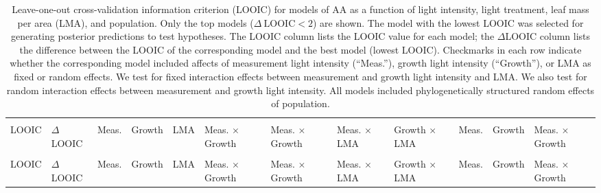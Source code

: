 \documentclass[
  letterpaper,
  DIV=11,
  numbers=noendperiod]{scrartcl}
\newcommand{\aax}{$\mathrm{AA}$}
\begin{document}
\begin{landscape}

\begin{longtable}[t]{>{\centering\arraybackslash}p{0.7in}>{\centering\arraybackslash}p{0.5in}>{\centering\arraybackslash}p{0.4in}>{\centering\arraybackslash}p{0.4in}>{\centering\arraybackslash}p{0.4in}>{\centering\arraybackslash}p{0.4in}>{\centering\arraybackslash}p{0.4in}>{\centering\arraybackslash}p{0.4in}>{\centering\arraybackslash}p{0.4in}>{\centering\arraybackslash}p{0.4in}>{\centering\arraybackslash}p{0.4in}>{\centering\arraybackslash}p{0.4in}}

\caption{\label{tbl-aa_loo2}Leave-one-out cross-validation information
criterion (LOOIC) for models of \aax{} as a function of light intensity,
light treatment, leaf mass per area (LMA), and population. Only the top
models (\(\Delta~\text{LOOIC} < 2\)) are shown. The model with the
lowest LOOIC was selected for generating posterior predictions to test
hypotheses. The LOOIC column lists the LOOIC value for each model; the
\(\Delta\)LOOIC column lists the difference between the LOOIC of the
corresponding model and the best model (lowest LOOIC). Checkmarks in
each row indicate whether the corresponding model included affects of
measurement light intensity (``Meas.''), growth light intensity
(``Growth''), or LMA as fixed or random effects. We test for fixed
interaction effects between measurement and growth light intensity and
LMA. We also test for random interaction effects between measurement and
growth light intensity. All models included phylogenetically structured
random effects of population.}

\tabularnewline

\toprule
\multicolumn{2}{c}{ } & \multicolumn{7}{c}{Fixed} & \multicolumn{3}{c}{Random} \\
\cmidrule(l{3pt}r{3pt}){3-9} \cmidrule(l{3pt}r{3pt}){10-12}
LOOIC & $\Delta$LOOIC & Meas. & Growth & LMA & Meas. $\times$ Growth & Meas. $\times$ Growth & Meas. $\times$ LMA & Growth $\times$ LMA & Meas. & Growth & Meas. $\times$ Growth\\
\midrule
\endfirsthead
\multicolumn{12}{@{}l}{\textit{(continued)}}\\
\toprule
LOOIC & $\Delta$LOOIC & Meas. & Growth & LMA & Meas. $\times$ Growth & Meas. $\times$ Growth & Meas. $\times$ LMA & Growth $\times$ LMA & Meas. & Growth & Meas. $\times$ Growth\\
\midrule
\endhead


\end{longtable}
\end{landscape}
\end{document}
